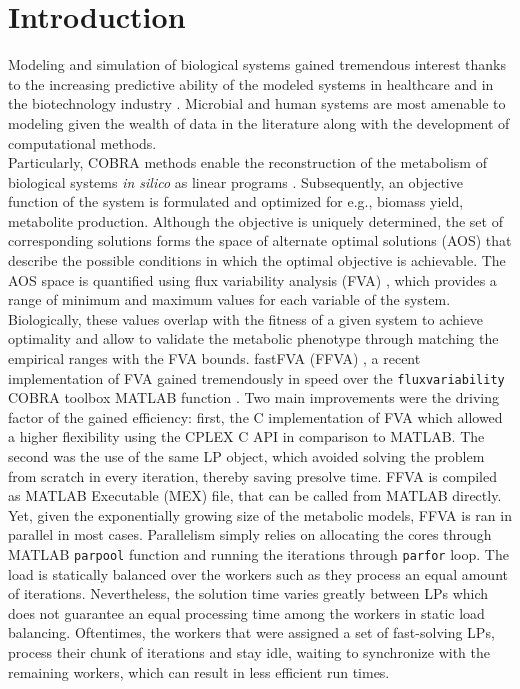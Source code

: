 \section*{Introduction}
Modeling and simulation of biological systems gained tremendous interest thanks to the increasing predictive ability of the modeled systems in healthcare and in the biotechnology industry \cite{gottstein2016constraint,oyaas2017genome}. Microbial and human systems are most amenable to modeling given the wealth of data in the literature along with the development of computational methods. \\
Particularly, COBRA methods enable the reconstruction of the metabolism of biological systems \textit{in silico} as linear programs \cite{o2015using}. Subsequently, an objective function of the system is formulated and optimized for e.g., biomass yield, metabolite production. Although the objective is uniquely determined, the set of corresponding solutions forms the space of alternate optimal solutions (AOS) that describe the possible conditions in which the optimal objective is achievable. The AOS space is quantified using flux variability analysis (FVA) \cite{mahadevan2003effects}, which provides a range of minimum and maximum values for each variable of the system. Biologically, these values overlap with the fitness of a given system to achieve optimality and allow to validate the metabolic phenotype through matching the empirical ranges with the FVA bounds.
fastFVA (FFVA) \cite{gudmundsson2010computationally}, a recent implementation of FVA gained tremendously in speed over the \texttt{fluxvariability} COBRA toolbox MATLAB function \cite{becker2007quantitative}. Two main improvements were the driving factor of the gained efficiency: first, the C implementation of FVA which allowed a higher flexibility using the CPLEX C API in comparison to MATLAB. The second was the use of the same LP object, which avoided solving the problem from scratch in every iteration, thereby saving presolve time. FFVA is compiled as MATLAB Executable (MEX) file, that can be called from MATLAB directly.\\
Yet, given the exponentially growing size of the metabolic models, FFVA is ran in parallel in most cases. Parallelism simply relies on allocating the cores through MATLAB \texttt{parpool} function and running the iterations through \texttt{parfor} loop. The load is statically balanced over the workers such as they process an equal amount of iterations. Nevertheless, the solution time varies greatly between LPs which does not guarantee an equal processing time among the workers in static load balancing. Oftentimes, the workers that were assigned a set of fast-solving LPs, process their chunk of iterations and stay idle, waiting to synchronize with the remaining workers, which can result in less efficient run times.
